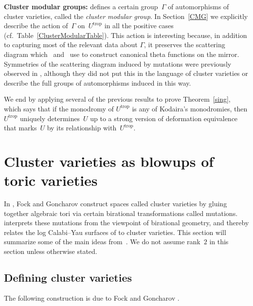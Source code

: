 \documentclass[10pt,a4paper]{amsart}
\numberwithin{equation}{section}
\numberwithin{figure}{section}
\numberwithin{table}{section}
\DeclareMathOperator{\trop}{trop}
\theoremstyle{definition}
\begin{document}
{\bf Cluster modular groups:} \cite{FG1} defines a certain group~$\Gamma$ of automorphisms of cluster varieties, called the {\it cluster modular group}. In Section~\ref{CMG} we explicitly describe the action of~$\Gamma$ on~$U^{\trop}$ in all the positive cases (cf.\ Table~\ref{ClusterModularTable}). This action is interesting because, in addition to capturing most of the relevant data about $\Gamma$, it preserves the scattering diagram which~\cite{GHK1} and~\cite{GHKK} use to construct canonical theta functions on the mirror. Symmetries of the scattering diagram induced by mutations were previously observed in \cite[Theorem~7]{GP}, although they did not put this in the language of cluster varieties or describe the full groups of automorphisms induced in this way.

We end by applying several of the previous results to prove Theorem~\ref{sing}, which says that if the monodromy of $U^{\trop}$ is any of Kodaira's monodromies, then $U^{\trop}$ uniquely determines~$U$ up to a strong version of deformation equivalence that marks~$U$ by its relationship with~$U^{\trop}$.

\section{Cluster varieties as blowups of toric varieties} \label{cluster}

In \cite{FG1}, Fock and Goncharov construct spaces called cluster varieties by gluing together algebraic tori via certain birational transformations called mutations. \cite{GHK3} interprets these mutations from the viewpoint of birational geometry, and thereby relates the log Calabi--Yau surfaces of \cite{GHK1} to cluster varieties. This section will summarize some of the main ideas from~\cite{GHK3}. We do not assume rank~$2$ in this section unless otherwise stated.

\subsection{Defining cluster varieties}\label{ClusterDefs}
The following construction is due to Fock and Goncharov \cite{FG1}.
\end{document}
